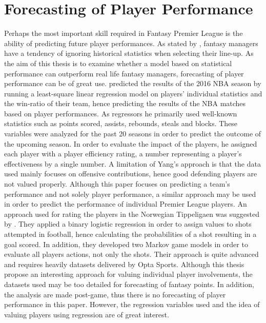 \begin{comment}
There is limited research available on optimization of a Fantasy Premier League team. However, due to the large amount of active NFL Fantasy Sports players, literature is available for both season- and weekly format. \cite{King} suggested a model for predicting points for the quarterbacks in the NFL, using Backward Stepwise regression and Support Vector regression models in his research. Further, he predicted fantasy points by use of Artificial Neural Networks. Similar approaches can be used in order to predict the performance of the Premier League players.
\end{comment}


\section{Forecasting of Player Performance} \label{Forecasting_of_player_performance}
Perhaps the most important skill required in Fantasy Premier League is the ability of predicting future player performances. As stated by \cite{Smith}, fantasy managers have a tendency of ignoring historical statistics when selecting their line-up. As the aim of this thesis is to examine whether a model based on statistical performance can outperform real life fantasy managers, forecasting of player performance can be of great use. 
\newpar
\cite{Yang} predicted the results of the 2016 NBA season by running a least-square linear regression model on players’ individual statistics and the win-ratio of their team, hence predicting the results of the NBA matches based on player performances. As regressors he primarily used well-known statistics such as points scored, assists, rebounds, steals and blocks. These variables were analyzed for the past 20 seasons in order to predict the outcome of the upcoming season. In order to evaluate the impact of the players, he assigned each player with a player efficiency rating, a number representing a player’s effectiveness by a single number. A limitation of Yang’s approach is that the data used mainly focuses on offensive contributions, hence good defending players are not valued properly. Although this paper focuses on predicting a team’s performance and not solely player performance, a similar approach may be used in order to predict the performance of individual Premier League players. 
\newpar
An approach used for rating the players in the Norwegian Tippeligaen was suggested by \citep{vabo}. They applied a binary logistic regression in order to assign values to shots attempted in football, hence calculating the probabilities of a shot resulting in a goal scored. In addition, they developed two Markov game models in order to evaluate all players actions, not only the shots. Their approach is quite advanced and requires heavily datasets delivered by Opta Sports. Although this thesis propose an interesting approach for valuing individual player involvements, the datasets used may be too detailed for forecasting of fantasy points. In addition, the analysis are made post-game, thus there is no forecasting of player performance in this paper. However, the regression variables used and the idea of valuing players using regression are of great interest.
